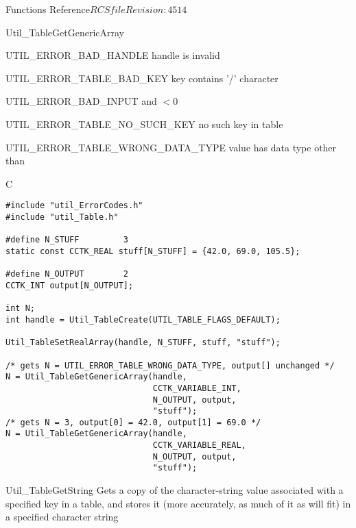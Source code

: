 \begin{cactuspart}{ Functions Reference}{$RCSfile$}{$Revision: 4514 $}
\begin{FunctionDescription}{Util\_TableGetGenericArray}
\begin{ErrorSection}
\begin{Error}{UTIL\_ERROR\_BAD\_HANDLE}
handle is invalid
\end{Error}
\begin{Error}{UTIL\_ERROR\_TABLE\_BAD\_KEY}
key contains '/' character
\end{Error}
\begin{Error}{UTIL\_ERROR\_BAD\_INPUT}
 and  $< 0$
\end{Error}
\begin{Error}{UTIL\_ERROR\_TABLE\_NO\_SUCH\_KEY}
no such key in table
\end{Error}
\begin{Error}{UTIL\_ERROR\_TABLE\_WRONG\_DATA\_TYPE}
value has data type other than 
\end{Error}
\end{ErrorSection}

\begin{ExampleSection}
\begin{Example}{C}
\begin{verbatim}
#include "util_ErrorCodes.h"
#include "util_Table.h"

#define N_STUFF         3
static const CCTK_REAL stuff[N_STUFF] = {42.0, 69.0, 105.5};

#define N_OUTPUT        2
CCTK_INT output[N_OUTPUT];

int N;
int handle = Util_TableCreate(UTIL_TABLE_FLAGS_DEFAULT);

Util_TableSetRealArray(handle, N_STUFF, stuff, "stuff");

/* gets N = UTIL_ERROR_TABLE_WRONG_DATA_TYPE, output[] unchanged */
N = Util_TableGetGenericArray(handle,
                              CCTK_VARIABLE_INT,
                              N_OUTPUT, output,
                              "stuff");
/* gets N = 3, output[0] = 42.0, output[1] = 69.0 */
N = Util_TableGetGenericArray(handle,
                              CCTK_VARIABLE_REAL,
                              N_OUTPUT, output,
                              "stuff");
\end{verbatim}
\end{Example}
\end{ExampleSection}
\end{FunctionDescription}


\begin{FunctionDescription}{Util\_TableGetString}
\label{Util-TableGetString}
Gets a copy of the character-string value associated with a specified
key in a table, and stores it (more accurately, as much of it as will fit)
in a specified character string


\end{FunctionDescription}
\end{cactuspart}
